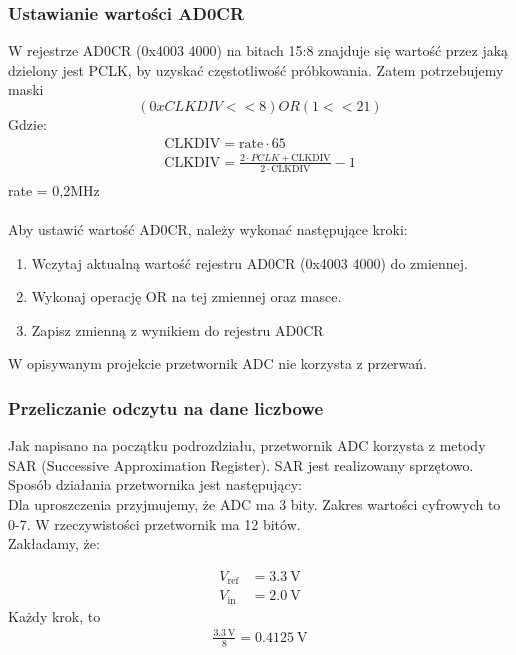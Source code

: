 \documentclass{article}
\begin{document}
\subsubsection{Ustawianie wartości AD0CR}
    W rejestrze AD0CR (0x4003 4000) na bitach 15:8 znajduje się wartość przez jaką dzielony jest PCLK, by uzyskać częstotliwość próbkowania.
    Zatem potrzebujemy maski \\
    \[
    (0xCLKDIV<<8) OR (1<<21)
    \]
    Gdzie:\\
    \begin{align*}
        \text{CLKDIV} = \text{rate} \cdot 65 \\
        \text{CLKDIV} = \frac{2 \cdot PCLK  + \text{CLKDIV}}{2 \cdot \text{CLKDIV}} - 1\\
    \end{align*}
    rate = 0,2MHz\\
    \\
    Aby ustawić wartość AD0CR, należy wykonać następujące kroki:
    \begin{enumerate}
        \item Wczytaj aktualną wartość rejestru AD0CR (0x4003 4000) do zmiennej.
        \item Wykonaj operację OR na tej zmiennej oraz masce.
        \item Zapisz zmienną z wynikiem do rejestru AD0CR
    \end{enumerate}
    W opisywanym projekcie przetwornik ADC nie korzysta z przerwań.

    \subsubsection{Przeliczanie odczytu na dane liczbowe}
    Jak napisano na początku podrozdziału, przetwornik ADC korzysta z metody SAR (Successive Approximation Register). SAR jest realizowany sprzętowo. Sposób działania przetwornika jest następujący:\\
    Dla uproszczenia przyjmujemy, że ADC ma 3 bity. Zakres wartości cyfrowych to 0-7. W rzeczywistości przetwornik ma 12 bitów.\\
    Zakładamy, że:

    \begin{align*}
        V_{\text{ref}} &= \SI{3.3}{\volt} \\
        V_{\text{in}} &= \SI{2.0}{\volt}
    \end{align*}
    Każdy krok, to 
    \begin{align*}
        \frac{\SI{3.3}{\volt}}{8} = \SI{0.4125}{\volt}
    \end{align*}
\end{document}
